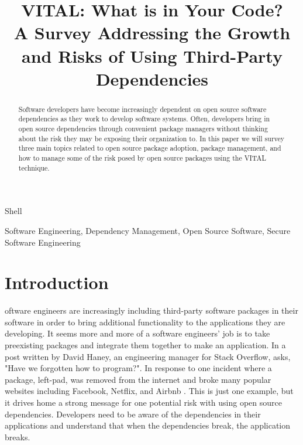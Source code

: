 \documentclass[journal]{IEEEtran}
\begin{document}
\title{VITAL: What is in Your Code? \protect\\  A Survey Addressing the Growth and Risks of Using Third-Party Dependencies}

\author{
}

%
{Shell}

\maketitle
\begin{abstract}
Software developers have become increasingly dependent on open source software dependencies as they work to develop software systems. Often, developers bring in open source dependencies through convenient package managers without thinking about the risk they may be exposing their organization to. In this paper we will survey three main topics related to  open source package adoption, package management, and how to manage some of the risk posed by open source packages using the VITAL technique. 
\end{abstract}

\begin{IEEEkeywords}
Software Engineering, Dependency Management, Open Source Software, Secure Software Engineering
\end{IEEEkeywords}

\section{Introduction}
oftware engineers are increasingly including third-party software packages in their software in order to bring additional functionality to the applications they are developing.  It seems more and more of a software engineers’ job is to take preexisting packages and integrate them together to make an application. In a post written by David Haney, an engineering manager for Stack Overflow, asks, "Have we forgotten how to program?". In response to one incident where a package, left-pad, was removed from the internet and broke many popular websites including Facebook, Netflix, and Airbnb \cite{Haney_2016}. This is just one example, but it drives home a strong message for one potential risk with using open source dependencies. Developers need to be aware of the dependencies in their applications and understand that when the dependencies break, the application breaks.   
\end{document}
